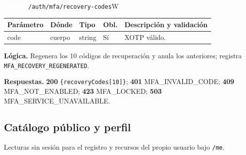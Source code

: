 \documentclass[11pt,a4paper]{report}
\newcommand{\verbo}[2]{\colorbox{#1}{\textcolor{white}{\ttfamily\bfseries\small #2}}}
\begin{document}
\begin{apiendpoint}{\verbo{verbpost}{POST}\ \texttt{/\allowbreak{}auth/\allowbreak{}mfa/\allowbreak{}recovery-codes}}{W}
\begin{tabularx}{\linewidth}{@{}>{\ttfamily\raggedright}p{3.0cm}p{1.35cm}p{1.9cm}p{0.9cm}X@{}}
\toprule \normalfont\bfseries Parámetro & \bfseries Dónde & \bfseries Tipo & \bfseries Obl. & \bfseries Descripción y validación\\ \midrule
code & cuerpo & string & Sí & XOTP válido.\\
\bottomrule\end{tabularx}
\par\smallskip\textbf{Lógica.} Regenera los 10 códigos de recuperación y anula los anteriores; registra \texttt{MFA\_RECOVERY\_REGENERATED}.
\par\smallskip\textbf{Respuestas.} \textbf{200} \texttt{\{recoveryCodes[10]\}}; \textbf{401} MFA\_INVALID\_CODE; \textbf{409} MFA\_NOT\_ENABLED; \textbf{423} MFA\_LOCKED; \textbf{503} MFA\_SERVICE\_UNAVAILABLE.
\end{apiendpoint}
\subsection{Catálogo público y perfil}
Lecturas sin sesión para el registro y recursos del propio usuario bajo \texttt{/\allowbreak{}me}.
\end{document}

